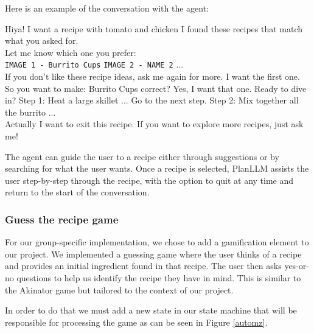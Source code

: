 \documentclass[runningheads]{llncs}
\begin{document}
Here is an example of the conversation with the agent:\\

\hspace{0.5cm} %
\begin{minipage}{1.2\textwidth} %
\begin{dialogue}
 Hiya!
 I want a recipe with tomato and chicken 
 I found these recipes that match what you asked for.\\
 Let me know which one you prefer:\\ 
 \texttt{IMAGE 1 - Burrito Cups} \texttt{IMAGE 2 - NAME 2} ...\\
 If you don't like these recipe ideas, ask me again for more.
 I want the first one.
 So you want to make: Burrito Cups correct?
 Yes, I want that one.
 Ready to dive in? Step 1: Heat a large skillet ...
 Go to the next step.
 Step 2: Mix together all the burrito ...\\
 Actually I want to exit this recipe.
 If you want to explore more recipes, just ask me!\\[5pt]
\end{dialogue}
\end{minipage}
The agent can guide the user to a recipe either through suggestions or by searching for what the user wants. Once a recipe is selected, PlanLLM assists the user step-by-step through the recipe, with the option to quit at any time and return to the start of the conversation.


\subsubsection{Guess the recipe game}
For our group-specific implementation, we chose to add a gamification element to our project. We implemented a guessing game where the user thinks of a recipe and provides an initial ingredient found in that recipe. The user then asks yes-or-no questions to help us identify the recipe they have in mind. This is similar to the Akinator game but tailored to the context of our project.

In order to do that we must add a new state in our state machine that will be responsible for processing the game as can be seen in Figure \ref{automz}.
\end{document}
